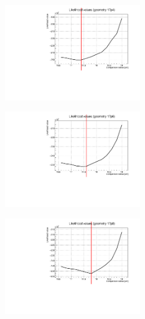 \documentclass[a4paper, 11pt, twoside, openright]{report}
\begin{document}
\begin{figure}[htbp]
\begin{minipage}[b]{.32\textwidth}
\includegraphics[width=6cm, height=4.6cm]{figs/likelihood250LowStat/likelihood17p4.pdf}
\end{minipage}\hfill
\begin{minipage}[b]{.32\textwidth}
\includegraphics[width=6cm, height=4.6cm]{figs/likelihood250LowStat/likelihood17p6.pdf}
\end{minipage} \hfill
\begin{minipage}[b]{.32\textwidth}
\includegraphics[width=6cm, height=4.6cm]{figs/likelihood250LowStat/likelihood17p8.pdf}
\end{minipage} \hfill \vspace{10pt}


\end{figure}
\end{document}
